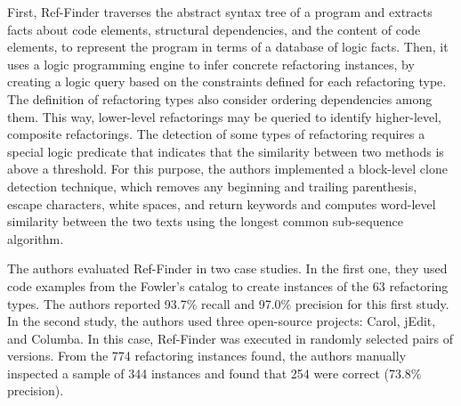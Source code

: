 First, Ref-Finder traverses the abstract syntax tree of a program and extracts facts about code elements, structural dependencies, and the content of code elements, to represent the program in terms of a database of logic facts. Then, it uses a logic programming engine to infer concrete refactoring instances, by creating a logic query based on the constraints defined for each refactoring type.
The definition of refactoring types also consider ordering dependencies among them. This way, lower-level refactorings may be queried to identify higher-level, composite refactorings.
The detection of some types of refactoring requires a special logic predicate that indicates that the similarity between two methods is above a threshold. For this purpose, the authors implemented a block-level clone detection technique, which removes any beginning and trailing parenthesis, escape characters, white spaces, and return keywords and computes word-level similarity between the two texts using the longest common sub-sequence algorithm.

The authors evaluated Ref-Finder in two case studies.
In the first one, they used code examples from the Fowler's catalog to create instances of the 63 refactoring types. The authors reported 93.7\% recall and 97.0\% precision for this first study.
In the second study, the authors used three open-source projects: Carol, jEdit, and Columba. In this case, Ref-Finder was executed in randomly selected pairs of versions. From the 774 refactoring instances found, the authors manually inspected a sample of 344 instances and found that 254 were correct (73.8\% precision).
